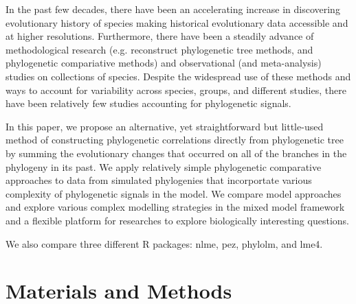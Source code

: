 In the past few decades, there have been an accelerating increase in discovering evolutionary history of species making historical evolutionary data accessible and at higher resolutions.
Furthermore, there have been a steadily advance of methodological research (e.g. reconstruct phylogenetic tree methods, and phylogenetic compariative methods) and observational (and meta-analysis) studies on collections of species. 
Despite the widespread use of these methods and ways to account for variability across species, groups, and different studies, there have been relatively few studies accounting for phylogenetic signals. 




In this paper, we propose an alternative, yet straightforward but little-used method of constructing phylogenetic correlations directly from phylogenetic tree by summing the evolutionary changes that occurred on all of the branches in the phylogeny in its past.
We apply relatively simple phylogenetic comparative approaches to data from simulated phylogenies that incorportate various complexity of phylogenetic signals in the model. 
We compare model approaches and explore various complex modelling strategies in the mixed model framework and a flexible platform for researches to explore biologically interesting questions.

We also compare three different R packages: nlme, pez, phylolm, and lme4.

\section{Materials and Methods}

